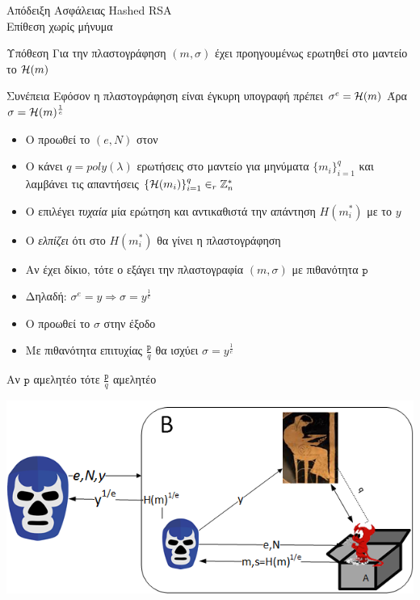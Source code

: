 \documentclass[handout]{beamer}
\begin{document}
\begin{frame}[allowframebreaks]{Απόδειξη Ασφάλειας Hashed RSA \\ Επίθεση χωρίς μήνυμα} 

\begin{block}{Υπόθεση}
Για την πλαστογράφηση $(m,\sigma)$ έχει προηγουμένως ερωτηθεί στο μαντείο το $\mathcal{H}(m)$
\end{block}

\begin{block}{Συνέπεια}
Εφόσον η πλαστογράφηση είναι έγκυρη υπογραφή πρέπει $\sigma^e = \mathcal{H}(m)$
Άρα $\sigma = \mathcal{H}(m)^{\frac{1}{e}}$
\end{block}

\framebreak

\begin{itemize}
\item Ο \advb προωθεί το $(e,N)$ στον \adv
\item O \adv κάνει $q=poly(\lambda)$ ερωτήσεις στο μαντείο για μηνύματα $\{m_i\}_{i=1}^q$ και λαμβάνει τις απαντήσεις $\{\mathcal{H}(m_i)\}_{i=1}^q \in_r \mathbb{Z}^*_n$
\item Ο \advb επιλέγει \emph{τυχαία} μία ερώτηση και αντικαθιστά την απάντηση $Η(m_i^*)$ με το $y$
\item Ο \advb \emph{ελπίζει} ότι στο $Η(m_i^*)$ θα γίνει η πλαστογράφηση
\item Αν έχει δίκιο, τότε ο \adv εξάγει την πλαστογραφία $(m,\sigma)$ με πιθανότητα $\mathtt{p}$
\item Δηλαδή: $\sigma^e = y \Rightarrow \sigma = y^\frac{1}{e}$
\item Ο \advb προωθεί το $\sigma$ στην έξοδο
\item Με πιθανότητα επιτυχίας $\frac{\mathtt{p}}{q}$ θα ισχύει $\sigma = y^\frac{1}{e}$
\end{itemize}

\begin{center}
Αν $\mathrm{\mathtt{p}}$ αμελητέο τότε $\frac{\mathtt{p}}{q}$ αμελητέο
\end{center}

\framebreak
\begin{center}
\includegraphics[scale=0.7]{ro-nom.png}
\end{center}
\end{frame}
\end{document}

